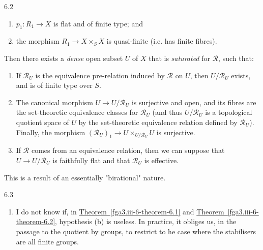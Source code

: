 \begin{theorem}{6.2}
    
 \begin{enumerate}
      
 \item[a.]
        \(p_1\colon  R_1\to  X\) is flat and of finite type; and
      

      
 \item[b.]
        the morphism \(R_1\to  X\times _S X\) is quasi-finite (i.e. has finite fibres).
      

    \end{enumerate}


    Then there exists a \emph{dense} open subset \(U\) of \(X\) that is \emph{saturated} for \(\mathcal {R}\), such that:

    
 \begin{enumerate}
      
 \item[i.]
        If \(\mathcal {R}_U\) is the equivalence pre-relation induced by \(\mathcal {R}\) on \(U\), then \(U/\mathcal {R}_U\) exists, and is of finite type over \(S\).
      


      
 \item[ii.]
        The canonical morphism \(U\to  U/\mathcal {R}_U\) is surjective and open, and its fibres are the set-theoretic equivalence classes for \(\mathcal {R}_U\) (and thus \(U/\mathcal {R}_U\) is a topological quotient space of \(U\) by the set-theoretic equivalence relation defined by \(\mathcal {R}_U\)).
        Finally, the morphism \((\mathcal {R}_U)_1\to  U\times _{U/\mathcal {R}_U}U\) is surjective.
      


      
 \item[iii.]
        If \(\mathcal {R}\) comes from an equivalence relation, then we can suppose that \(U\to  U/\mathcal {R}_U\) is faithfully flat and that \(\mathcal {R}_U\) is effective.
      

    \end{enumerate}\end{theorem}\par{}This is a result of an essentially "birational" nature.\begin{remarks}{6.3}\label{fga3.iii-6-remarks-6.3}\skipsinglepar\begin{enumerate}\item{}I do not know if, in \hyperref[fga3.iii-6-theorem-6.1]{Theorem~\ref*{fga3.iii-6-theorem-6.1}} and \hyperref[fga3.iii-6-theorem-6.2]{Theorem~\ref*{fga3.iii-6-theorem-6.2}}, hypothesis (b) is useless.
      In practice, it obliges us, in the passage to the quotient by groups, to restrict to he case where the stabilisers are all finite groups.


\end{enumerate}
\end{remarks}
